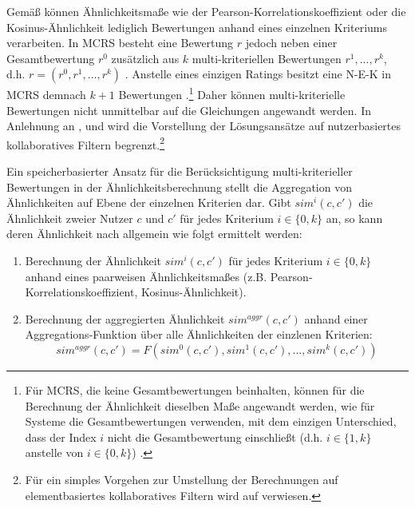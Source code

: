 Gemäß \textcite[S. 856f.]{adomavicius:4:inbook} können Ähnlichkeitsmaße wie der Pearson-Korrelationskoeffizient oder die Kosinus-Ähnlichkeit lediglich Bewertungen anhand eines einzelnen Kriteriums verarbeiten.
In \ac{MCRS} besteht eine Bewertung $r$ jedoch neben einer Gesamtbewertung $r^{0}$ zusätzlich aus $k$ multi-kriteriellen Bewertungen $r^{1}, ..., r^{k}$, d.h. $r=(r^{0},r^{1}, ..., r^{k})$ \cite[S. 426]{recommenderSystems:2016}\cite[S. 857]{adomavicius:4:inbook}.
Anstelle eines einzigen Ratings besitzt eine \ac{N-E-K} in \ac{MCRS} demnach $k+1$ Bewertungen \cite[S. 857]{adomavicius:4:inbook}.\footnote{Für \ac{MCRS}, die keine Gesamtbewertungen beinhalten, können für die Berechnung der Ähnlichkeit dieselben Maße angewandt werden, wie für Systeme die Gesamtbewertungen verwenden, mit dem einzigen Unterschied, dass der Index $i$ nicht die Gesamtbewertung einschließt (d.h. $i \in \{1,k\}$ anstelle von $i \in \{0,k\}$) \cite[S. 857]{adomavicius:4:inbook}.}
Daher können multi-kriterielle Bewertungen nicht unmittelbar auf die Gleichungen angewandt werden.
In Anlehnung an \textcite[S. 49]{adomavicius:inproceedings:2}, \textcite[S. 860]{adomavicius:4:inbook} und \textcite[S. 427]{recommenderSystems:2016} wird die Vorstellung der Lösungsansätze auf nutzerbasiertes kollaboratives Filtern begrenzt.\footnote{Für ein simples Vorgehen zur Umstellung der Berechnungen auf elementbasiertes kollaboratives Filtern wird auf \textcite[S. 49]{adomavicius:inproceedings:2} verwiesen.}

Ein speicherbasierter Ansatz für die Berücksichtigung multi-kriterieller Bewertungen in der Ähnlichkeitsberechnung stellt die Aggregation von Ähnlichkeiten auf Ebene der einzelnen Kriterien dar.
Gibt $sim^{i}(c,c')$ die Ähnlichkeit zweier Nutzer $c$ und $c'$ für jedes Kriterium $i \in \{0,k\}$ an, so kann deren Ähnlichkeit nach \textcite[S. 427]{recommenderSystems:2016} allgemein wie folgt ermittelt werden:
\begin{enumerate}
    \item Berechnung der Ähnlichkeit $sim^{i}(c,c')$ für jedes Kriterium $i \in \{0,k\}$ anhand eines paarweisen Ähnlichkeitsmaßes (z.B. Pearson-Korrelations\-koeffizient, Kosinus-Ähnlichkeit).
    \item Berechnung der aggregierten Ähnlichkeit $sim^{aggr}(c,c')$ anhand einer Aggregations-Funktion über alle Ähnlichkeiten der einzlenen Kriterien:
    \begin{equation}
        sim^{aggr}(c,c') = F(sim^{0}(c,c'), sim^{1}(c,c'), ..., sim^{k}(c,c'))
    \end{equation}
\end{enumerate}

